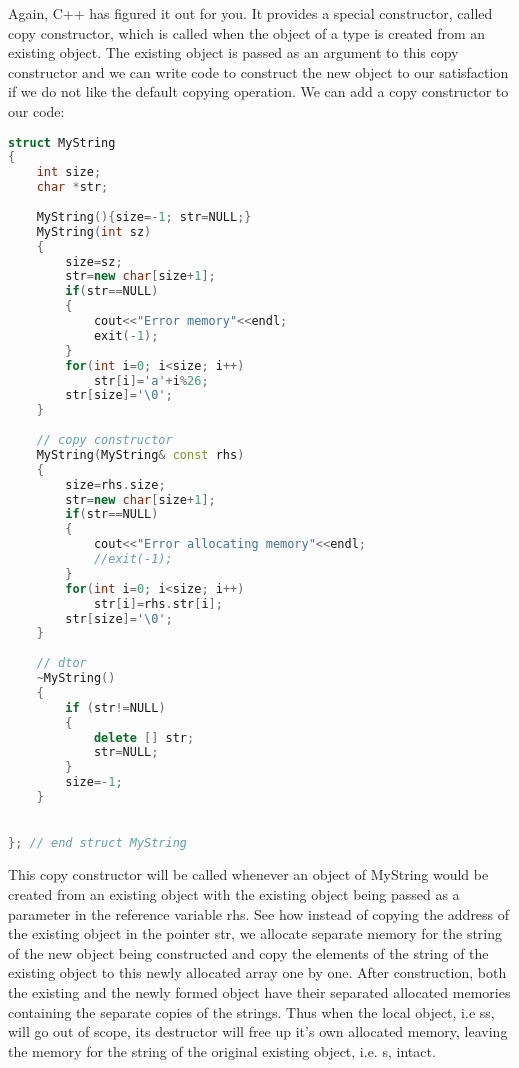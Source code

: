 \documentclass[11pt,fleqn]{book} %
\begin{document}
Again, C++ has figured it out for you. It provides a special constructor, called copy constructor, which is called when the object of a type is created from an existing object. The existing object is passed as an argument to this copy constructor and we can write code to construct the new object to our satisfaction if we do not like the default copying operation. We can add a copy constructor to our code:
\begin{lstlisting}[language=C++, caption = Copy Constructor]
struct MyString 
{
	int size;
	char *str;
	
	MyString(){size=-1; str=NULL;} 
	MyString(int sz)
	{
		size=sz;
		str=new char[size+1];
		if(str==NULL)
		{
			cout<<"Error memory"<<endl;
			exit(-1);
		} 
		for(int i=0; i<size; i++)
			str[i]='a'+i%26;
		str[size]='\0';
	}
	
	// copy constructor
	MyString(MyString& const rhs)
	{
		size=rhs.size;
		str=new char[size+1];
		if(str==NULL)
		{
			cout<<"Error allocating memory"<<endl;
			//exit(-1);
		} 
		for(int i=0; i<size; i++)
			str[i]=rhs.str[i];
		str[size]='\0';
	}	
	
	// dtor
	~MyString()
	{
		if (str!=NULL)
		{
			delete [] str;
			str=NULL;
		} 
		size=-1; 
	}
	

}; // end struct MyString
\end{lstlisting}

\noindent This copy constructor will be called whenever an object of MyString would be created from an existing object with the existing object being passed as a parameter in the reference variable rhs. See how instead of copying the address of the existing object in the pointer str, we allocate separate memory for the string of the new object being constructed and copy the elements of the string of the existing object to this newly allocated array one by one. After construction, both the existing and the newly formed object have their separated allocated memories containing the separate copies of the strings. Thus when the local object, i.e ss,  will go out of scope, its destructor will free up it's own allocated memory, leaving the memory for the string of the original existing object, i.e. s, intact.
\end{document}
